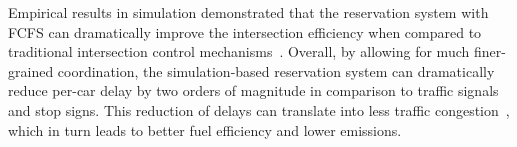 


Empirical results in simulation demonstrated that the 
reservation system with FCFS can dramatically improve the intersection
efficiency when compared to traditional intersection control
mechanisms~\cite{bib:Dresner08Multiagent}.  Overall, by
allowing for much finer-grained coordination, the simulation-based
reservation system can dramatically reduce per-car delay by two orders
of magnitude in comparison to traffic signals and stop signs.  This
reduction of delays can translate into less traffic
congestion~\cite{bib:Au10Motion,bib:Quinlan10Bringing}, which in turn
leads to better fuel efficiency and lower emissions.





